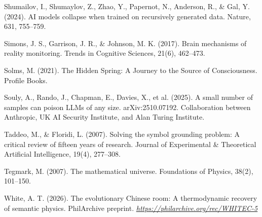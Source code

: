\documentclass[12pt]{article}
\begin{document}
Shumailov, I., Shumaylov, Z., Zhao, Y., Papernot, N., Anderson, R., \&
Gal, Y. (2024). AI models collapse when trained on recursively generated
data. Nature, 631, 755--759.

Simons, J. S., Garrison, J. R., \& Johnson, M. K. (2017). Brain
mechanisms of reality monitoring. Trends in Cognitive Sciences, 21(6),
462--473.

Solms, M. (2021). The Hidden Spring: A Journey to the Source of
Consciousness. Profile Books.

Souly, A., Rando, J., Chapman, E., Davies, X., et al. (2025). A small
number of samples can poison LLMs of any size. arXiv:2510.07192.
Collaboration between Anthropic, UK AI Security Institute, and Alan
Turing Institute.

Taddeo, M., \& Floridi, L. (2007). Solving the symbol grounding problem:
A critical review of fifteen years of research. Journal of Experimental
\& Theoretical Artificial Intelligence, 19(4), 277--308.

Tegmark, M. (2007). The mathematical universe. Foundations of Physics,
38(2), 101--150.

White, A. T. (2026). The evolutionary Chinese room: A thermodynamic
recovery of semantic physics. PhilArchive preprint.
\href{https://philarchive.org/rec/WHITEC-5}{\textit{https://philarchive.org/rec/WHITEC-5}}

\endgroup
\end{document}
